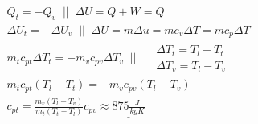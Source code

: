 \documentclass[12pt,a4paper,finnish]{article}
\begin{document}
\begin{align}
 &Q_t = -Q_v \;\;\bigg|\bigg|\;\; \Delta U = Q + W = Q\\
 &\Delta U_t = -\Delta U_v \;\;\bigg|\bigg|\;\; \Delta U = m\Delta u = mc_v\Delta T = mc_p\Delta T\\
 &m_tc_{pt}\Delta T_t = -m_vc_{pv}\Delta T_v \;\;\bigg|\bigg|\;\;
  \begin{aligned}
    &\Delta T_t = T_l - T_t\\
    &\Delta T_v = T_l - T_v
  \end{aligned}\\
 &m_tc_{pt}(T_l - T_t) = -m_vc_{pv}(T_l - T_v)\\
 &c_{pt} = \frac{m_v(T_l - T_v)}{m_t(T_t - T_l)}c_{pv} \approx \underline{875\frac{J}{kgK}}
\end{align}
\end{document}
